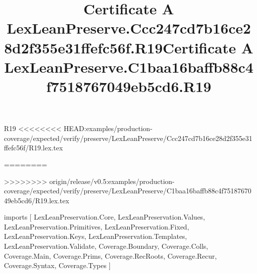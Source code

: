 \begin{lexlean}{R19}
<<<<<<<< HEAD:examples/production-coverage/expected/verify/preserve/LexLeanPreserve/Ccc247cd7b16ce28d2f355e31ffefc56f/R19.lex.tex
\title{Certificate A LexLeanPreserve.Ccc247cd7b16ce28d2f355e31ffefc56f.R19}
========
\title{Certificate A LexLeanPreserve.C1baa16baffb88c4f7518767049eb5cd6.R19}
>>>>>>>> origin/release/v0.5:examples/production-coverage/expected/verify/preserve/LexLeanPreserve/C1baa16baffb88c4f7518767049eb5cd6/R19.lex.tex
\begin{coremodule}
imports [
  LexLeanPreservation.Core,
  LexLeanPreservation.Values,
  LexLeanPreservation.Primitives,
  LexLeanPreservation.Fixed,
  LexLeanPreservation.Keys,
  LexLeanPreservation.Templates,
  LexLeanPreservation.Validate,
  Coverage.Boundary,
  Coverage.Colls,
  Coverage.Main,
  Coverage.Prims,
  Coverage.RecRoots,
  Coverage.Recur,
  Coverage.Syntax,
  Coverage.Types
]


\end{coremodule}
\end{lexlean}
